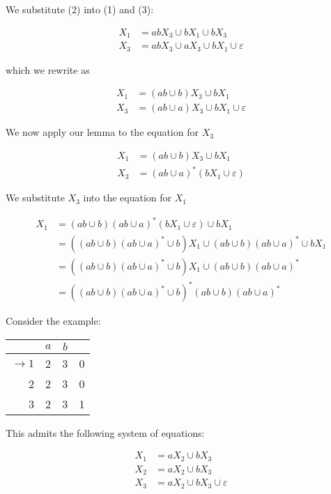 We substitute (2) into (1) and (3):

\begin{align*}
      X_1 &= abX_3\cup bX_1\cup bX_3\\
      X_3 &= abX_3\cup aX_3\cup bX_1\cup\varepsilon
\end{align*}

which we rewrite as

\begin{align*}
      X_1 &= (ab\cup b)X_3\cup bX_1\\
      X_3 &= (ab\cup a)X_3\cup bX_1\cup\varepsilon
\end{align*}

We now apply our lemma to the equation for \(X_3\)

\begin{align*}
      X_1 &= (ab\cup b)X_3\cup bX_1\\
      X_3 &= (ab\cup a)^*(bX_1\cup\varepsilon)
\end{align*}

We substitute \(X_3\) into the equation for \(X_1\)

\begin{align*}
      X_1&=(ab\cup b)(ab\cup a)^*(bX_1\cup\varepsilon)\cup bX_1\\
         &=\left((ab\cup b)(ab\cup a)^*\cup b\right)X_1\cup (ab\cup b)(ab\cup a)^*\cup bX_1\\
         &=\left((ab\cup b)(ab\cup a)^*\cup b\right)X_1\cup (ab\cup b)(ab\cup a)^*\\
         &=\left((ab\cup b)(ab\cup a)^*\cup b\right)^*(ab\cup b)(ab\cup a)^*
\end{align*}

Consider the example:

\begin{center}\begin{tabular}{r| c c r}
      & \(a\) & \(b\) & \\\bottomrule
      \(\to 1\) & 2 & 3 & 0\\
            2 & 2 & 3 & 0\\
            3 & 2 & 3 & 1
 \end{tabular}\end{center}

 This admits the following system of equations:

 \begin{align*}
      X_1 &= aX_2\cup bX_3\\
      X_2 &= aX_2\cup bX_3\\
      X_3 &= aX_2\cup bX_3\cup\varepsilon
\end{align*}


